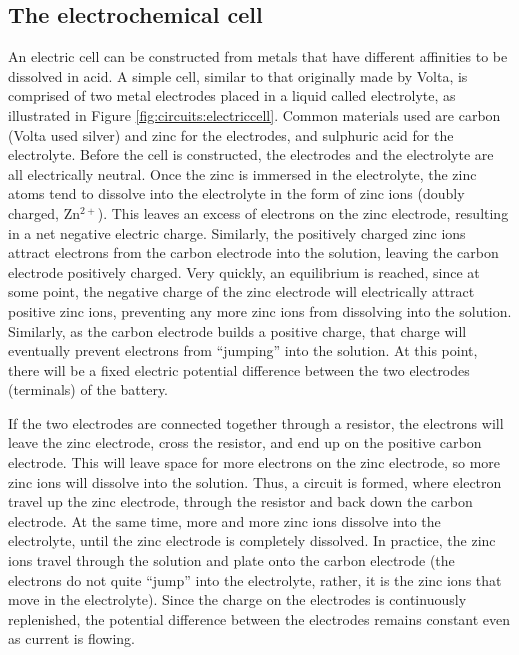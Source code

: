 \subsection{The electrochemical cell}
An electric cell can be constructed from metals that have different affinities to be dissolved in acid. A simple cell, similar to that originally made by Volta, is comprised of two metal electrodes placed in a liquid called electrolyte, as illustrated in Figure \ref{fig:circuits:electriccell}. Common materials used are carbon (Volta used silver) and zinc for the electrodes, and sulphuric acid for the electrolyte. Before the cell is constructed, the electrodes and the electrolyte are all electrically neutral.
Once the zinc is immersed in the electrolyte, the zinc atoms tend to dissolve into the electrolyte in the form of zinc ions (doubly charged, Zn$^{2+}$). This leaves an excess of electrons on the zinc electrode, resulting in a net negative electric charge. Similarly, the positively charged zinc ions attract electrons from the carbon electrode into the solution, leaving the carbon electrode positively charged. Very quickly, an equilibrium is reached, since at some point, the negative charge of the zinc electrode will electrically attract positive zinc ions, preventing any more zinc ions from dissolving into the solution. Similarly, as the carbon electrode builds a positive charge, that charge will eventually prevent electrons from ``jumping'' into the solution. At this point, there will be a fixed electric potential difference between the two electrodes (terminals) of the battery. 

If the two electrodes are connected together through a resistor, the electrons will leave the zinc electrode, cross the resistor, and end up on the positive carbon electrode. This will leave space for more electrons on the zinc electrode, so more zinc ions will dissolve into the solution. Thus, a circuit is formed, where electron travel up the zinc electrode, through the resistor and back down the carbon electrode. At the same time, more and more zinc ions dissolve into the electrolyte, until the zinc electrode is completely dissolved. In practice, the zinc ions travel through the solution and plate onto the carbon electrode (the electrons do not quite ``jump'' into the electrolyte, rather, it is the zinc ions that move in the electrolyte). Since the charge on the electrodes is continuously replenished, the potential difference between the electrodes remains constant even as current is flowing.

